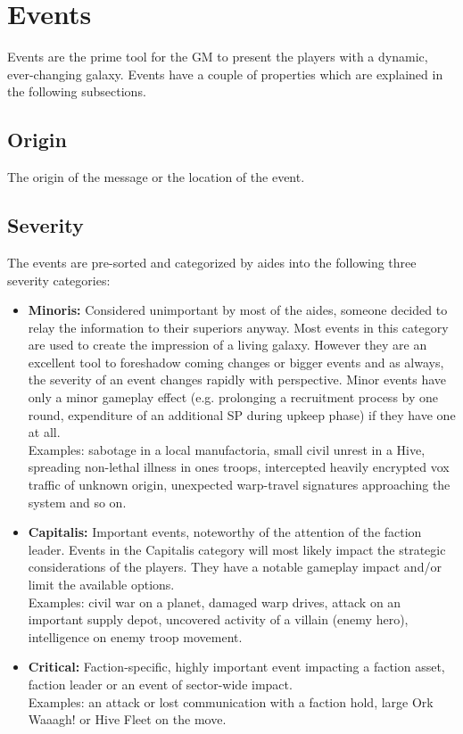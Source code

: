 
\section{Events}
Events are the prime tool for the GM to present the players with a dynamic, ever-changing galaxy. Events have a couple of properties which are explained in the following subsections.

\subsection{Origin}
The origin of the message or the location of the event.

\subsection{Severity}
The events are pre-sorted and categorized by aides into the following three severity categories:
\begin{itemize}
	\item \textbf{Minoris:} Considered unimportant by most of the aides, someone decided to relay the information to their superiors anyway. Most events in this category are used to create the impression of a living galaxy. However they are an excellent tool to foreshadow coming changes or bigger events and as always, the severity of an event changes rapidly with perspective. Minor events have only a minor gameplay effect (e.g. prolonging a recruitment process by one round, expenditure of an additional SP during upkeep phase) if they have one at all.\\
	Examples: sabotage in a local manufactoria, small civil unrest in a Hive, spreading non-lethal illness in ones troops, intercepted heavily encrypted vox traffic of unknown origin, unexpected warp-travel signatures approaching the system and so on.
	\item \textbf{Capitalis:} Important events, noteworthy of the attention of the faction leader. Events in the Capitalis category will most likely impact the strategic considerations of the players. They have a notable gameplay impact and/or limit the available options.\\
	Examples: civil war on a planet, damaged warp drives, attack on an important supply depot, uncovered activity of a villain (enemy hero), intelligence on enemy troop movement.
	\item \textbf{Critical:} Faction-specific, highly important event impacting a faction asset, faction leader or an event of sector-wide impact.\\
	Examples: an attack or lost communication with a faction hold, large Ork Waaagh! or Hive Fleet on the move.
\end{itemize}

